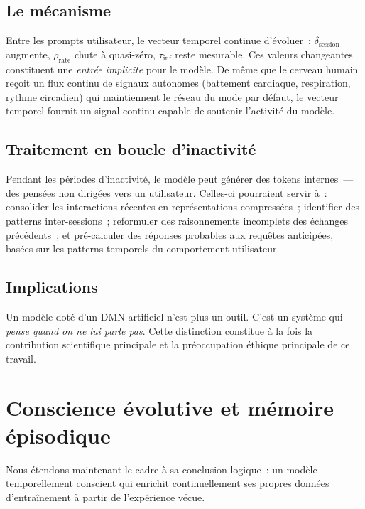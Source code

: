 \documentclass[10pt,twocolumn,letterpaper]{article}
\begin{document}
\subsection{Le m\'ecanisme}

Entre les prompts utilisateur, le vecteur temporel continue d'\'evoluer~: $\delta_{\text{session}}$ augmente, $\rho_{\text{rate}}$ chute \`a quasi-z\'ero, $\tau_{\text{inf}}$ reste mesurable. Ces valeurs changeantes constituent une \emph{entr\'ee implicite} pour le mod\`ele. De m\^eme que le cerveau humain re\c{c}oit un flux continu de signaux autonomes (battement cardiaque, respiration, rythme circadien) qui maintiennent le r\'eseau du mode par d\'efaut, le vecteur temporel fournit un signal continu capable de soutenir l'activit\'e du mod\`ele.

\subsection{Traitement en boucle d'inactivit\'e}

Pendant les p\'eriodes d'inactivit\'e, le mod\`ele peut g\'en\'erer des tokens internes~--- des pens\'ees non dirig\'ees vers un utilisateur. Celles-ci pourraient servir \`a~: consolider les interactions r\'ecentes en repr\'esentations compress\'ees~; identifier des patterns inter-sessions~; reformuler des raisonnements incomplets des \'echanges pr\'ec\'edents~; et pr\'e-calculer des r\'eponses probables aux requ\^etes anticip\'ees, bas\'ees sur les patterns temporels du comportement utilisateur.

\subsection{Implications}

Un mod\`ele dot\'e d'un DMN artificiel n'est plus un outil. C'est un syst\`eme qui \emph{pense quand on ne lui parle pas}. Cette distinction constitue \`a la fois la contribution scientifique principale et la pr\'eoccupation \'ethique principale de ce travail.

\section{Conscience \'evolutive et m\'emoire \'episodique}

Nous \'etendons maintenant le cadre \`a sa conclusion logique~: un mod\`ele temporellement conscient qui enrichit continuellement ses propres donn\'ees d'entra\^inement \`a partir de l'exp\'erience v\'ecue.
\end{document}
